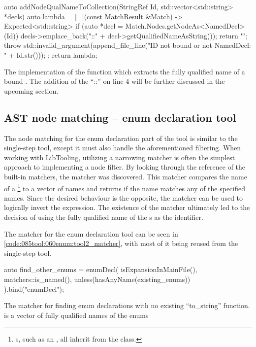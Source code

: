 \begin{listing}[H]
  \begin{cppcode}
auto addNodeQualNameToCollection(StringRef Id, std::vector<std::string> *decls) {
	auto lambda = [=](const MatchResult &Match) -> Expected<std::string> {
		if (auto *decl = Match.Nodes.getNodeAs<NamedDecl>(Id)) {
			decls->emplace_back("::" + decl->getQualifiedNameAsString());
			return "";
		}
		throw std::invalid_argument(append_file_line("ID not bound or not NamedDecl: " + Id.str()));
	};
	return lambda;
}
  \end{cppcode}
  \caption{The implementation of the function which extracts the fully qualified name of a bound . The addition of the ``::'' on line 4 will be further discussed in the upcoming section.}
  \label{code:085tool:060enum:tool1_node_processing}
\end{listing}

\pagebreak
\subsection{AST node matching -- enum declaration tool}\label{subsubsec:080dev:085examples:060enum:matching_second_tool}
The node matching for the enum declaration part of the tool is similar to the single-step tool, except it must also handle the aforementioned filtering.
When working with LibTooling, utilizing a narrowing matcher is often the simplest approach to implementing a node filter.
By looking through the reference of the built-in matchers, the   matcher was discovered.
This matcher compares the name of a \footnote{s, such as an , all inherit from the  class.} to a vector of names and returns  if the name matches any of the specified names.
Since the desired behaviour is the opposite, the  matcher can be used to logically invert the expression.
The existence of the  matcher ultimately led to the decision of using the fully qualified name of the s as the identifier.

The matcher for the enum declaration tool can be seen in \cref{code:085tool:060enum:tool2_matcher}, with most of it being reused from the single-step tool.

\begin{listing}[H]
  \begin{cppcode}
auto find_other_enums = enumDecl(
    isExpansionInMainFile(),
    matchers::is_named(),
    unless(hasAnyName(existing_enums))
  ).bind("enumDecl");
  \end{cppcode}
  \caption{The matcher for finding enum declarations with no existing ``to\_string'' function.  is a vector of fully qualified names of the enums }
  \label{code:085tool:060enum:tool2_matcher}
\end{listing}

